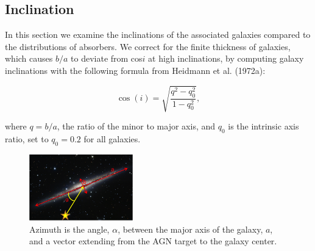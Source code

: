 \documentclass[iop]{emulateapj-rtx4}
\begin{document}
\subsection{Inclination}
In this section we examine the inclinations of the associated galaxies compared to the distributions of absorbers. We correct for the finite thickness of galaxies, which causes $b/a$ to deviate from cos$i$ at high inclinations, by computing galaxy inclinations with the following formula from Heidmann et al. (1972a):

\begin{equation}
	\cos(i) = \sqrt{\frac{q^2 - q_0^2}{1 - q_0^2}},
	\label{incEq}
\end{equation}

\noindent where $q = b/a$, the ratio of the minor to major axis, and $q_0$ is the intrinsic axis ratio, set to $q_0 = 0.2$ for all galaxies. 


\begin{figure}[ht!]
        \centering
        \includegraphics[width=0.4\textwidth]{azimuth_illustration2.png}
        \caption{\small{Azimuth is the angle, $\alpha$, between the major axis of the galaxy, $a$, and a vector extending from the AGN target to the galaxy center.}}
        \label{azimuth_illustration}
\end{figure} 
\end{document}
